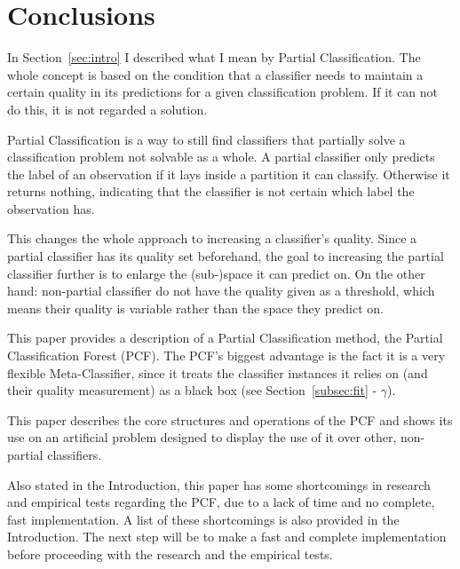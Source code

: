 \section{Conclusions}
\label{sec:conclusions}

In Section~\ref{sec:intro} I described what I mean by
Partial Classification. The whole concept is based on the
condition that a classifier needs to maintain a certain
quality in its predictions for a given classification
problem. If it can not do this, it is not regarded a
solution.

Partial Classification is a way to still find classifiers
that partially solve a classification problem not solvable
as a whole. A partial classifier only predicts the label
of an observation if it lays inside a partition it can
classify. Otherwise it returns nothing, indicating that
the classifier is not certain which label the observation
has.

This changes the whole approach to increasing a
classifier's quality. Since a partial classifier has its
quality set beforehand, the goal to increasing the partial
classifier further is to enlarge the (sub-)space it can
predict on. On the other hand: non-partial classifier do
not have the quality given as a threshold, which means
their quality is variable rather than the space they
predict on.

This paper provides a description of a Partial
Classification method, the Partial Classification Forest
(PCF). The PCF's biggest advantage is the fact it is a very
flexible Meta-Classifier, since it treats the classifier
instances it relies on (and their quality measurement) as a
black box (see Section~\ref{subsec:fit} - $\gamma$).

This paper describes the core structures and operations of
the PCF and shows its use on an artificial problem designed
to display the use of it over other, non-partial
classifiers.

Also stated in the Introduction, this paper has some
shortcomings in research and empirical tests regarding the
PCF, due to a lack of time and no complete, fast
implementation. A list of these shortcomings is also
provided in the Introduction. The next step will be to make
a fast and complete implementation before proceeding with
the research and the empirical tests.
